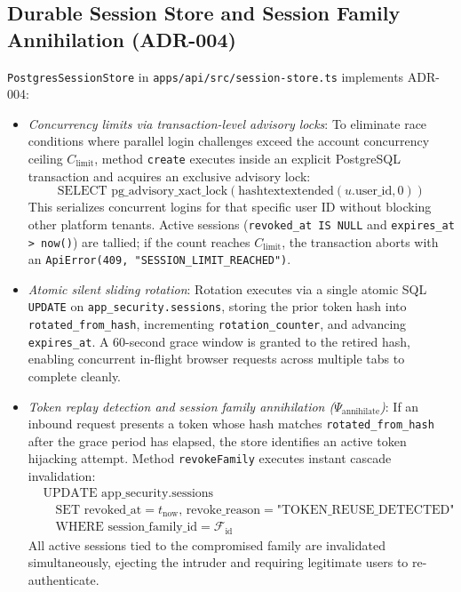 \subsection{Durable Session Store and Session Family Annihilation (ADR-004)}
\texttt{PostgresSessionStore} in \texttt{apps/api/src/session-store.ts} implements ADR-004:
\begin{itemize}
    \item[-] \textit{Concurrency limits via transaction-level advisory locks}: To eliminate race conditions where parallel login challenges exceed the account concurrency ceiling $C_{\text{limit}}$, method \texttt{create} executes inside an explicit PostgreSQL transaction and acquires an exclusive advisory lock:
    \begin{equation}
    \label{eq:advisory_lock_en}
    \text{SELECT pg\_advisory\_xact\_lock}(\text{hashtextextended}(u.\text{user\_id}, 0))
    \end{equation}
    This serializes concurrent logins for that specific user ID without blocking other platform tenants. Active sessions (\texttt{revoked\_at IS NULL} and \texttt{expires\_at > now()}) are tallied; if the count reaches $C_{\text{limit}}$, the transaction aborts with an \texttt{ApiError(409, "SESSION\_LIMIT\_REACHED")}.
    \item[-] \textit{Atomic silent sliding rotation}: Rotation executes via a single atomic SQL \texttt{UPDATE} on \texttt{app\_security.sessions}, storing the prior token hash into \texttt{rotated\_from\_hash}, incrementing \texttt{rotation\_counter}, and advancing \texttt{expires\_at}. A 60-second grace window is granted to the retired hash, enabling concurrent in-flight browser requests across multiple tabs to complete cleanly.
    \item[-] \textit{Token replay detection and session family annihilation ($\Psi_{\text{annihilate}}$)}: If an inbound request presents a token whose hash matches \texttt{rotated\_from\_hash} after the grace period has elapsed, the store identifies an active token hijacking attempt. Method \texttt{revokeFamily} executes instant cascade invalidation:
    \begin{equation}
    \label{eq:revoke_family_en}
    \begin{aligned}
    &\text{UPDATE app\_security.sessions} \\
    &\quad \text{SET revoked\_at} = t_{\text{now}}, \, \text{revoke\_reason} = \text{"TOKEN\_REUSE\_DETECTED"} \\
    &\quad \text{WHERE session\_family\_id} = \mathcal{F}_{\text{id}}
    \end{aligned}
    \end{equation}
    All active sessions tied to the compromised family are invalidated simultaneously, ejecting the intruder and requiring legitimate users to re-authenticate.
\end{itemize}

